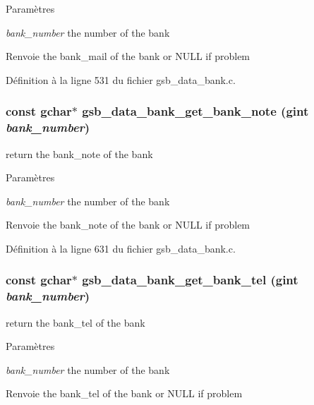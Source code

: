 \begin{DoxyParams}{Paramètres}
\item[{\em bank\_\-number}]the number of the bank\end{DoxyParams}
\begin{DoxyReturn}{Renvoie}
the bank\_\-mail of the bank or NULL if problem 
\end{DoxyReturn}


Définition à la ligne 531 du fichier gsb\_\-data\_\-bank.c.

\subsubsection[{gsb\_\-data\_\-bank\_\-get\_\-bank\_\-note}]{\setlength{\rightskip}{0pt plus 5cm}const gchar$\ast$ gsb\_\-data\_\-bank\_\-get\_\-bank\_\-note (gint {\em bank\_\-number})}\label{gsb__data__bank_8c_ada7393b44071e69a795f9609bc158f8e}
return the bank\_\-note of the bank


\begin{DoxyParams}{Paramètres}
\item[{\em bank\_\-number}]the number of the bank\end{DoxyParams}
\begin{DoxyReturn}{Renvoie}
the bank\_\-note of the bank or NULL if problem 
\end{DoxyReturn}


Définition à la ligne 631 du fichier gsb\_\-data\_\-bank.c.

\subsubsection[{gsb\_\-data\_\-bank\_\-get\_\-bank\_\-tel}]{\setlength{\rightskip}{0pt plus 5cm}const gchar$\ast$ gsb\_\-data\_\-bank\_\-get\_\-bank\_\-tel (gint {\em bank\_\-number})}\label{gsb__data__bank_8c_a22fcd40a34e1067278131a3605c4f99b}
return the bank\_\-tel of the bank


\begin{DoxyParams}{Paramètres}
\item[{\em bank\_\-number}]the number of the bank\end{DoxyParams}
\begin{DoxyReturn}{Renvoie}
the bank\_\-tel of the bank or NULL if problem 
\end{DoxyReturn}


